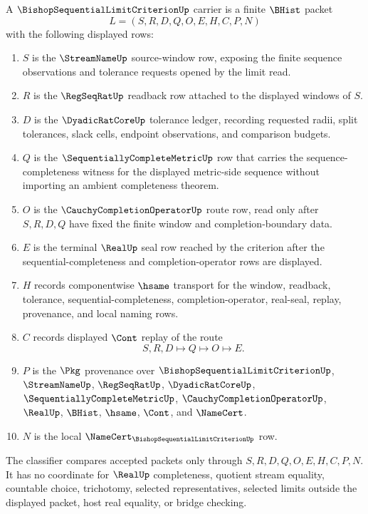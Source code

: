 \begin{definition}
\label{def:bishop-sequential-limit-criterion-carrier}
A $\BishopSequentialLimitCriterionUp$ carrier is a finite $\BHist$ packet
$$
L=(S,R,D,Q,O,E,H,C,P,N)
$$
with the following displayed rows:
\begin{enumerate}
\item $S$ is the $\StreamNameUp$ source-window row, exposing the finite sequence observations and tolerance requests opened by the limit read.
\item $R$ is the $\RegSeqRatUp$ readback row attached to the displayed windows of $S$.
\item $D$ is the $\DyadicRatCoreUp$ tolerance ledger, recording requested radii, split tolerances, slack cells, endpoint observations, and comparison budgets.
\item $Q$ is the $\SequentiallyCompleteMetricUp$ row that carries the sequence-completeness witness for the displayed metric-side sequence without importing an ambient completeness theorem.
\item $O$ is the $\CauchyCompletionOperatorUp$ route row, read only after $S,R,D,Q$ have fixed the finite window and completion-boundary data.
\item $E$ is the terminal $\RealUp$ seal row reached by the criterion after the sequential-completeness and completion-operator rows are displayed.
\item $H$ records componentwise $\hsame$ transport for the window, readback, tolerance, sequential-completeness, completion-operator, real-seal, replay, provenance, and local naming rows.
\item $C$ records displayed $\Cont$ replay of the route
$$
S,R,D \longmapsto Q \longmapsto O \longmapsto E .
$$
\item $P$ is the $\Pkg$ provenance over $\BishopSequentialLimitCriterionUp$, $\StreamNameUp$, $\RegSeqRatUp$, $\DyadicRatCoreUp$, $\SequentiallyCompleteMetricUp$, $\CauchyCompletionOperatorUp$, $\RealUp$, $\BHist$, $\hsame$, $\Cont$, and $\NameCert$.
\item $N$ is the local $\NameCert_{\BishopSequentialLimitCriterionUp}$ row.
\end{enumerate}
The classifier compares accepted packets only through $S,R,D,Q,O,E,H,C,P,N$. It has no coordinate for $\RealUp$ completeness, quotient stream equality, countable choice, trichotomy, selected representatives, selected limits outside the displayed packet, host real equality, or bridge checking.
\end{definition}

